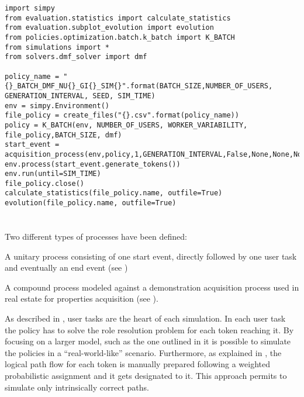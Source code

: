 \begin{lstlisting}[caption=Structure example of simulation framework using a K-Batch policy with \gls{dmf},label=lst:simulation_script,style=CustomPython]
import simpy
from evaluation.statistics import calculate_statistics
from evaluation.subplot_evolution import evolution
from policies.optimization.batch.k_batch import K_BATCH
from simulations import *
from solvers.dmf_solver import dmf

policy_name = "{}_BATCH_DMF_NU{}_GI{}_SIM{}".format(BATCH_SIZE,NUMBER_OF_USERS, GENERATION_INTERVAL, SEED, SIM_TIME)
env = simpy.Environment()
file_policy = create_files("{}.csv".format(policy_name))
policy = K_BATCH(env, NUMBER_OF_USERS, WORKER_VARIABILITY, file_policy,BATCH_SIZE, dmf)
start_event = acquisition_process(env,policy,1,GENERATION_INTERVAL,False,None,None,None)
env.process(start_event.generate_tokens())
env.run(until=SIM_TIME)
file_policy.close()
calculate_statistics(file_policy.name, outfile=True)
evolution(file_policy.name, outfile=True)
\end{lstlisting}

\section{}

Two different types of processes have been defined:
\begin{enumerate*}
	\item A unitary process consisting of one start event, directly followed by one user task and eventually an end event (see )
	\item A compound process modeled against a demonstration acquisition process used in real estate for properties acquisition (see ).
\end{enumerate*}



As described in , user tasks are the heart of each simulation. In each user task the policy has to solve the role resolution problem for each token reaching it. By focusing on a larger model, such as the one outlined in  it is possible to simulate the policies in a ``real-world-like'' scenario. Furthermore, as explained in , the logical path flow for each token is manually prepared following a weighted probabilistic assignment and it gets designated to it. This approach permits to simulate only intrinsically correct paths. 

